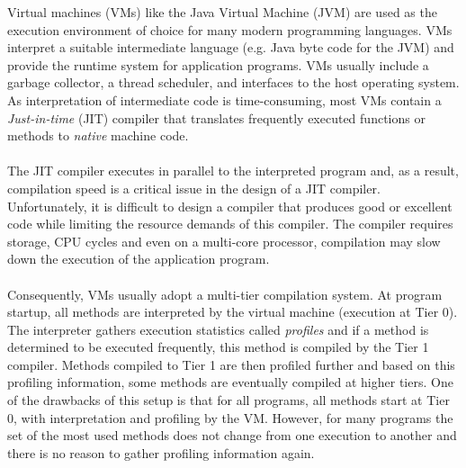 Virtual machines (VMs) like the Java Virtual Machine (JVM) are used as the execution environment of choice for many modern programming languages. 
VMs interpret a suitable intermediate language (e.g. Java byte code for the JVM) and provide the runtime system for application programs. VMs usually include a garbage collector, a thread scheduler, and interfaces to the host operating system. 
As interpretation of intermediate code is time-consuming, most VMs contain a \textit{Just-in-time} (JIT) compiler that translates frequently executed functions or methods to \textit{native} machine code.
\\\\
The JIT compiler executes in parallel to the interpreted program and, as a result, compilation speed is a critical issue in the design of a JIT compiler.
Unfortunately, it is difficult to design a compiler that produces good or excellent code while limiting the resource demands of this compiler. The compiler requires storage, CPU cycles and even on a multi-core processor, compilation may slow down the execution of the application program.
\\\\
Consequently, VMs usually adopt a multi-tier compilation system.
At program startup, all methods are interpreted by the virtual machine (execution at Tier 0). The interpreter gathers execution statistics called \textit{profiles} and if a method is determined to be executed frequently, this method is compiled by the Tier 1 compiler. Methods compiled to Tier 1 are then profiled further and based on this profiling information, some methods are eventually compiled at higher tiers.
One of the drawbacks of this setup is that for all programs, all methods start at Tier 0, with interpretation and profiling by the VM. However, for many programs the set of the most used methods does not change from one execution to another and there is no reason to gather profiling information again. 

